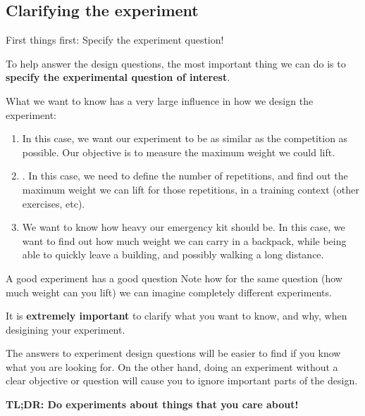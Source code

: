 \subsection{Clarifying the experiment}

\begin{frame}[t]{First things first: Specify the experiment question!}

    To help answer the design questions, the most important thing we can do is to {\bf specify the experimental question of interest}.\bigskip

    What we want to know has a very large influence in how we design the experiment:
    \begin{enumerate}
        \item {} In this case, we want our experiment to be as similar as the competition as possible. Our objective is to measure the maximum weight we could lift.
        \item {}. In this case, we need to define the number of repetitions, and find out the maximum weight we can lift for those repetitions, in a training context (other exercises, etc).
        \item \alert{We want to know how heavy our emergency kit should be}. In this case, we want to find out how much weight we can carry in a backpack, while being able to quickly leave a building, and possibly walking a long distance.
    \end{enumerate}
\end{frame}

\begin{frame}[t]{A good experiment has a good question}
    Note how for the same question (how much weight can you lift) we can imagine completely different experiments.\bigskip

    It is {\bf extremely important} to clarify what you want to know, and why, when desigining your experiment.\bigskip 

    The answers to experiment design questions will be easier to find if you know what you are looking for. \alert{On the other hand, doing an experiment without a clear objective or question will cause you to ignore important parts of the design}.\bigskip 

    {\bf TL;DR: Do experiments about things that you care about!}
\end{frame}

